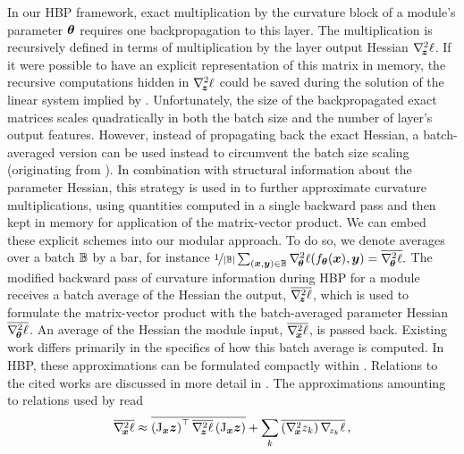 In our HBP framework, exact multiplication by the curvature block of a module's
parameter ${\bm{\theta}}$ requires one backpropagation to this layer. The
multiplication is recursively defined in terms of multiplication by the layer
output Hessian $\nabla_{\!{{\bm{z}}}}^{2}\ell$. If it were possible to have an explicit
representation of this matrix in memory, the recursive computations hidden in
$\nabla_{\!{{\bm{z}}}}^{2}\ell $ could be saved during the solution of the linear system
implied by . Unfortunately, the size of the
backpropagated exact matrices scales quadratically in both the batch
size and the number of layer's output features. However, instead
of propagating back the exact Hessian, a batch-averaged version can be used
instead to circumvent the batch size scaling (originating from
\citet{botev2017practical}). In combination with structural information about
the parameter Hessian, this strategy is used in
\citet{botev2017practical,wei2018bdapch} to further approximate curvature
multiplications, using quantities computed in a single backward pass and then
kept in memory for application of the matrix-vector product. We can embed these
explicit schemes into our modular approach. To do so, we denote averages over a
batch ${\mathbb{B}}$ by a bar, for instance
\begin{math}
  \nicefrac{1}{|{\mathbb{B}}|} \sum_{({\bm{x}}, {\bm{y}}) \in {\mathbb{B}}}
  \nabla_{\!{{\bm{\theta}}}}^{2}\ell(f_{{\bm{\theta}}}({\bm{x}}), {\bm{y}}) =
  \overline{ \nabla_{\!{{\bm{\theta}}}}^{2}\ell }.
\end{math}
The modified backward pass of curvature information during HBP for a module
receives a batch average of the Hessian \wrt the output,
$\overline{ \nabla_{\!{{\bm{z}}}}^{2}\ell  }$, which is used to formulate the matrix-vector
product with the batch-averaged parameter Hessian
$\overline{ \nabla_{\!{{\bm{\theta}}}}^{2} \ell }$. An average of the Hessian \wrt the
module input, $\overline{ \nabla_{\!{{\bm{x}}}}^{2} \ell }$, is passed back. Existing work
\citep{botev2017practical,wei2018bdapch} differs primarily in the specifics of
how this batch average is computed. In HBP, these approximations can be
formulated compactly within . Relations to
the cited works are discussed in more detail in . The
approximations amounting to relations used by \citet{botev2017practical} read
\begin{align}
  \label{hbp::equ:hessians_batch_average}
  \overline{ \nabla_{\!{{\bm{x}}}}^{2} \ell }
  \approx
  \overline{ \left(\mathrm{J}_{{\bm{x}}} {\bm{z}} \right)^\top
  \overline{ \nabla_{\!{{\bm{z}}}}^{2}\ell  }
  \left(\mathrm{J}_{{\bm{x}}}{\bm{z}}\right) }
  + \sum_k \overline{ \left(\nabla_{\!{{\bm{x}}}}^{2} z_k\right)
  \nabla_{\!{z_k}}\ell }\,,
\end{align}
